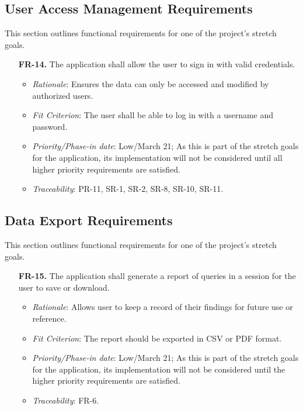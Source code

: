 \documentclass[12pt]{article}
\begin{document}
\subsection{User Access Management Requirements}
This section outlines functional requirements for one of the project's stretch
goals.
\begin{enumerate}
  \item[\textbf{FR-14.}] The application shall allow the user to sign in with valid credentials.
  \begin{itemize}
    \item \textit{Rationale}: Ensures the data can only be accessed and modified by authorized users.
    \item \textit{Fit Criterion}: The user shall be able to log in with a username and password.
    \item \textit{Priority/Phase-in date}: Low/March 21; As this is part of the stretch goals for the application, its implementation will not be considered until all higher priority requirements are satisfied.
    \item \textit{Traceability}: PR-11, SR-1, SR-2, SR-8, SR-10, SR-11.
  \end{itemize}
\end{enumerate}

\subsection{Data Export Requirements}
This section outlines functional requirements for one of the project's stretch
goals.
\begin{enumerate}
  \item[\textbf{FR-15.}] The application shall generate a report of queries in a session for the user to save or download.
  \begin{itemize}
    \item \textit{Rationale}: Allows user to keep a record of their findings for future use or reference.
    \item \textit{Fit Criterion}: The report should be exported in CSV or PDF format.
    \item \textit{Priority/Phase-in date}: Low/March 21; As this is part of the stretch goals for the application, its implementation will not be considered until the higher priority requirements are satisfied.
    \item \textit{Traceability}: FR-6.
  \end{itemize}
\end{enumerate}
\end{document}
